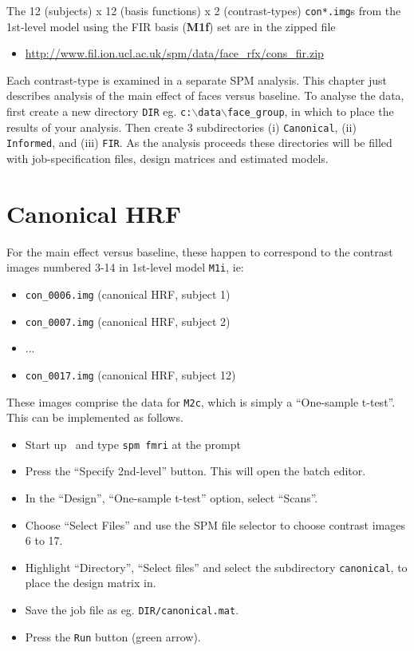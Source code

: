 The 12 (subjects) x 12 (basis functions) x 2 (contrast-types) \texttt{con*.img}s from the 1st-level model using the FIR basis (\textbf{M1f}) set are in the zipped file
\begin{itemize}
\item \url{http://www.fil.ion.ucl.ac.uk/spm/data/face_rfx/cons_fir.zip}
\end{itemize}

Each contrast-type is examined in a separate SPM analysis. This chapter just describes analysis of the main effect of faces versus baseline.
To analyse the data, first create a new directory \texttt{DIR} eg. \texttt{c:$\backslash$data$\backslash$face\_group}, in which to place the results of your analysis. Then create 3 subdirectories (i) \texttt{Canonical}, (ii) \texttt{Informed}, and (iii) \texttt{FIR}. 
As the analysis proceeds these directories will be filled with job-specification files, design matrices and estimated models.

\section{Canonical HRF}

For the main effect versus baseline, these happen to correspond to the contrast images numbered 3-14 in 1st-level model \texttt{M1i}, ie:

\begin{itemize}
\item \texttt{con\_0006.img}       (canonical HRF, subject 1)
\item \texttt{con\_0007.img}       (canonical HRF, subject 2)
\item ...
\item \texttt{con\_0017.img}       (canonical HRF, subject 12)
\end{itemize}
These images comprise the data for \texttt{M2c}, which is simply a ``One-sample t-test''. This can be implemented as follows.
\begin{itemize}
\item Start up \matlab\ and type \texttt{spm fmri} at the prompt
\item Press the ``Specify 2nd-level'' button. This will open the batch editor.
\item In the ``Design'', ``One-sample t-test'' option, select ``Scans''.
\item Choose ``Select Files'' and use the SPM file selector to choose contrast images 6 to 17.
\item Highlight ``Directory'', ``Select files'' and select the  subdirectory \texttt{canonical}, to place the design matrix in.
\item Save the job file as eg. \texttt{DIR/canonical.mat}.
\item Press the \texttt{Run} button (green arrow).
\end{itemize}

